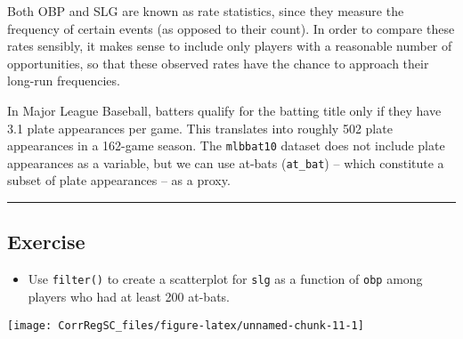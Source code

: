 \documentclass[
]{book}
\newenvironment{Shaded}{\begin{snugshade}}{\end{snugshade}}
\newcommand{\CommentTok}[1]{\textcolor[rgb]{0.56,0.35,0.01}{\textit{#1}}}
\newcommand{\DataTypeTok}[1]{\textcolor[rgb]{0.13,0.29,0.53}{#1}}
\newcommand{\DecValTok}[1]{\textcolor[rgb]{0.00,0.00,0.81}{#1}}
\newcommand{\KeywordTok}[1]{\textcolor[rgb]{0.13,0.29,0.53}{\textbf{#1}}}
\newcommand{\NormalTok}[1]{#1}
\newcommand{\OperatorTok}[1]{\textcolor[rgb]{0.81,0.36,0.00}{\textbf{#1}}}
\newcommand{\StringTok}[1]{\textcolor[rgb]{0.31,0.60,0.02}{#1}}
\providecommand{\tightlist}{%
  \setlength{\itemsep}{0pt}\setlength{\parskip}{0pt}}
\begin{document}
Both OBP and SLG are known as rate statistics, since they measure the frequency of certain events (as opposed to their count). In order to compare these rates sensibly, it makes sense to include only players with a reasonable number of opportunities, so that these observed rates have the chance to approach their long-run frequencies.

In Major League Baseball, batters qualify for the batting title only if they have 3.1 plate appearances per game. This translates into roughly 502 plate appearances in a 162-game season. The \texttt{mlbbat10} dataset does not include plate appearances as a variable, but we can use at-bats (\texttt{at\_bat}) -- which constitute a subset of plate appearances -- as a proxy.

\begin{center}\rule{0.5\linewidth}{0.5pt}\end{center}

\hypertarget{exercise-4}{%
\subsection*{Exercise}\label{exercise-4}}

\begin{itemize}
\tightlist
\item
  Use \texttt{filter()} to create a scatterplot for \texttt{slg} as a function of \texttt{obp} among players who had at least 200 at-bats.
\end{itemize}

\begin{Shaded}
\end{Shaded}

\begin{center}\texttt{[image: CorrRegSC\_files/figure-latex/unnamed-chunk-11-1]} \end{center}
\end{document}
